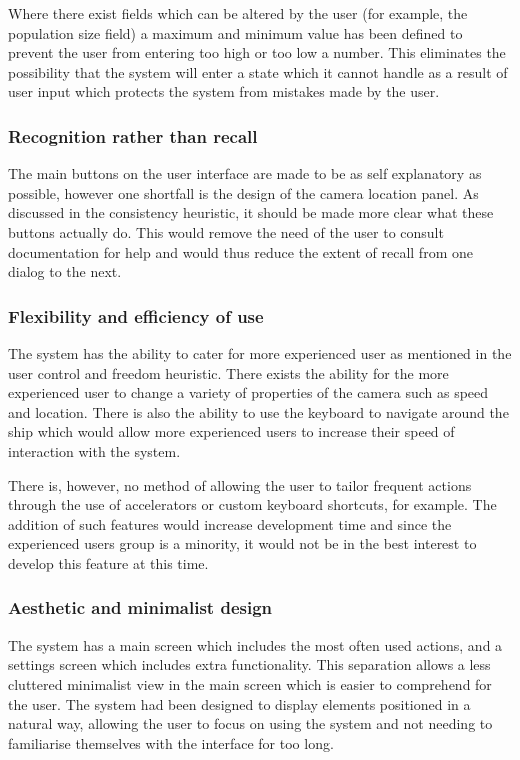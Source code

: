 Where there exist fields which can be altered by the user (for example, the population size field) a maximum and minimum value has been defined to prevent the user from entering too high or too low a number. This eliminates the possibility that the system will enter a state which it cannot handle as a result of user input which protects the system from mistakes made by the user.

\subsubsection{Recognition rather than recall}
The main buttons on the user interface are made to be as self explanatory as possible, however one shortfall is the design of the camera location panel. As discussed in the consistency heuristic, it should be made more clear what these buttons actually do. This would remove the need of the user to consult documentation for help and would thus reduce the extent of recall from one dialog to the next.

\subsubsection{Flexibility and efficiency of use}
The system has the ability to cater for more experienced user as mentioned in the user control and freedom heuristic. There exists the ability for the more experienced user to change a variety of properties of the camera such as speed and location. There is also the ability to use the keyboard to navigate around the ship which would allow more experienced users to increase their speed of interaction with the system.

There is, however, no method of allowing the user to tailor frequent actions through the use of accelerators or custom keyboard shortcuts, for example. The addition of such features would increase development time and since the experienced users group is a minority, it would not be in the best interest to develop this feature at this time.

\subsubsection{Aesthetic and minimalist design}
The system has a main screen which includes the most often used actions, and a settings screen which includes extra functionality. This separation allows a less cluttered minimalist view in the main screen which is easier to comprehend for the user. The system had been designed to display elements positioned in a natural way, allowing the user to focus on using the system and not needing to familiarise themselves with the interface for too long.   

